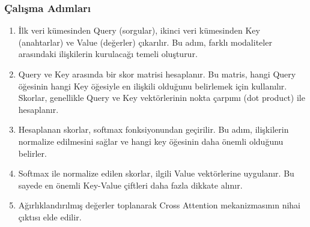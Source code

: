 \subsubsection{Çalışma Adımları}

\begin{enumerate}
    \item İlk veri kümesinden Query (sorgular), ikinci veri kümesinden Key (anahtarlar) ve Value (değerler) çıkarılır. Bu adım, farklı modaliteler arasındaki ilişkilerin kurulacağı temeli oluşturur.
    \item Query ve Key arasında bir skor matrisi hesaplanır. Bu matris, hangi Query öğesinin hangi Key öğesiyle en ilişkili olduğunu belirlemek için kullanılır. Skorlar, genellikle Query ve Key vektörlerinin nokta çarpımı (dot product) ile hesaplanır.
    \item Hesaplanan skorlar, softmax fonksiyonundan geçirilir. Bu adım, ilişkilerin normalize edilmesini sağlar ve hangi key öğesinin daha önemli olduğunu belirler.
    \item Softmax ile normalize edilen skorlar, ilgili Value vektörlerine uygulanır. Bu sayede en önemli Key-Value çiftleri daha fazla dikkate alınır.
    \item Ağırlıklandırılmış değerler toplanarak Cross Attention mekanizmasının nihai çıktısı elde edilir.
\end{enumerate}

\newpage